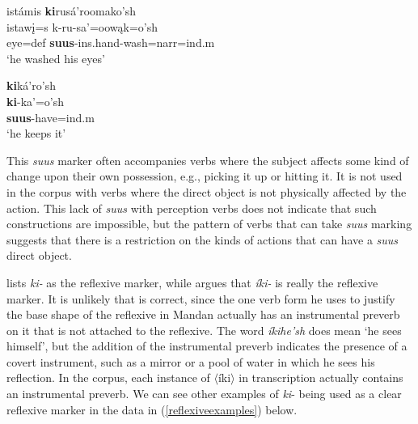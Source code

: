 \begin{exe}
\begin{xlist}
	\item \glll istámis \textbf{ki}rusá'roomako'sh\\
	istawį=s\textbf{ }k-ru-sa'=oowąk=o'sh\\
	\textnormal{eye}=def \textbf{suus}-ins.hand-\textnormal{wash}=narr=ind.m\\
	\glt `he washed his eyes' \citep[37]{hollow1973a}
	
	\item \glll \textbf{ki}ká'ro'sh\\
	\textbf{ki}-ka'=o'sh\\
	\textbf{suus}-\textnormal{have}=ind.m\\
	\glt `he keeps it' \citep[102]{hollow1970}
	
	\end{xlist}

\end{exe}

This \textit{suus} marker often accompanies verbs where the subject affects some kind of change upon their own possession, e.g., picking it up or hitting it. It is not used in the corpus with verbs where the direct object is not physically affected by the action. This lack of \textit{suus} with perception verbs does not indicate that such constructions are impossible, but the pattern of verbs that can take \textit{suus} marking suggests that there is a restriction on the kinds of actions that can have a \textit{suus} direct object.

\label{reflexivemarker}

\citet[31]{kennard1936} lists \textit{ki-} as the reflexive marker, while \citet[440]{hollow1970} argues that \textit{íki-} is really the reflexive marker. It is unlikely that \citeauthor{hollow1970} is correct, since the one verb form he uses to justify the base shape of the reflexive in Mandan actually has an instrumental preverb on it that is not attached to the reflexive. The word \textit{íkihe'sh} does mean `he sees himself', but the addition of the instrumental preverb indicates the presence of a covert instrument, such as a mirror or a pool of water in which he sees his reflection. In the corpus, each instance of $\langle$íki$\rangle$ in  transcription actually contains an instrumental preverb. We can see other examples of \textit{ki}- being used as a clear reflexive marker in the data in (\ref{reflexiveexamples}) below.


